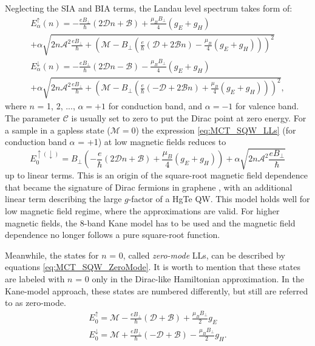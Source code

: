 \documentclass[titlepage,a4paper]{book}
\begin{document}
Neglecting the SIA and BIA terms, the Landau level spectrum takes form of:
\begin{equation}
\label{eq:MCT_SQW_LLs}
\begin{aligned}
E^{\uparrow}_{\alpha}(n) = -\frac{eB_{\perp}}{\hbar}(2\mathcal{D}n+\mathcal{B})+\frac{\mu_B B_{\perp}}{4}(g_E + g_H) \\
+ \alpha\sqrt{2n\mathcal{A}^2\frac{eB_{\perp}}{\hbar} + \left(\mathcal{M}-B_{\perp} \left(\frac{e}{\hbar}(\mathcal{D}+2\mathcal{B}n)-\frac{\mu_B}{4}(g_E + g_H)\right)\right)^2} \\
E^{\downarrow}_{\alpha}(n) = -\frac{eB_{\perp}}{\hbar}(2\mathcal{D}n-\mathcal{B})-\frac{\mu_B B_{\perp}}{4}(g_E + g_H) \\
+ \alpha\sqrt{2n\mathcal{A}^2\frac{eB_{\perp}}{\hbar} + \left(\mathcal{M}-B_{\perp} \left(\frac{e}{\hbar}(-\mathcal{D}+2\mathcal{B}n)+\frac{\mu_B}{4}(g_E + g_H)\right)\right)^2}, 
\end{aligned}
\end{equation}
where $n$ = 1, 2, ..., $\alpha = +1$ for conduction band, and $\alpha = -1$ for valence band. The parameter $\mathcal{C}$ is usually set to zero to put the Dirac point at zero energy. For a sample in a gapless state ($\mathcal{M} = 0$) the expression \ref{eq:MCT_SQW_LLs} (for conduction band $\alpha$ = +1) at low magnetic fields reduces to
\begin{equation}
\label{eq:MCT_SQW_LLs2}
E^{\uparrow (\downarrow)}_0 = B_{\perp}\left( -\frac{e}{\hbar}(2\mathcal{D}n+\mathcal{B})+\frac{\mu_B}{4}(g_E + g_H)\right)+\alpha\sqrt{2n\mathcal{A}^2\frac{eB_{\perp}}{\hbar}}
\end{equation}
up to linear terms. This is an origin of the square-root magnetic field dependence that became the signature of Dirac fermions in graphene \cite{Castro_graphene}, with an additional linear term describing the large $g$-factor of a HgTe QW. This model holds well for low magnetic field regime, where the approximations are valid. For higher magnetic fields, the 8-band Kane model has to be used and the magnetic field dependence no longer follows a pure square-root function.

Meanwhile, the states for $n$ = 0, called \textit{zero-mode} \cite{Bernevig_Topology2} LLs, can be described by equations \ref{eq:MCT_SQW_ZeroMode}. It is worth to mention that these states are labeled with $n$ = 0 only in the Dirac-like Hamiltonian approximation. In the Kane-model approach, these states are numbered differently, but still are referred to as zero-mode. 
\begin{equation}
\label{eq:MCT_SQW_ZeroMode}
\begin{aligned}
E^{\uparrow}_0 = \mathcal{M} -\frac{eB_{\perp}}{\hbar}(\mathcal{D}+\mathcal{B})+\frac{\mu_B B_{\perp}}{2}g_E \\
E^{\downarrow}_0 = \mathcal{M} +\frac{eB_{\perp}}{\hbar}(-\mathcal{D}+\mathcal{B})-\frac{\mu_B B_{\perp}}{2}g_H.
\end{aligned}
\end{equation}
\end{document}
